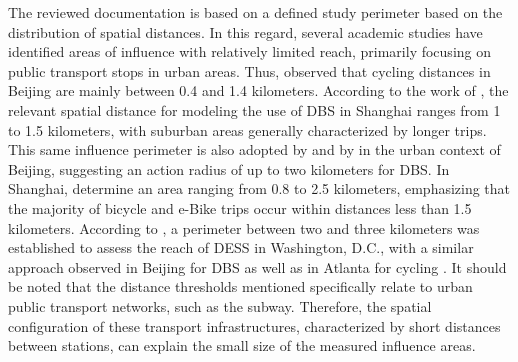 \begin{refsegment}
The reviewed documentation is based on a defined study perimeter based on the distribution of spatial distances. In this regard, several academic studies have identified areas of influence with relatively limited reach, primarily focusing on public transport stops in urban areas. Thus, \textcolor{blue}{\textcite[5]{wang_interchange_2016}} observed that cycling distances in Beijing are mainly between 0.4 and 1.4 kilometers. According to the work of \textcolor{blue}{\textcite[11]{hu_examining_2022}}, the relevant spatial distance for modeling the use of \acrshort{DBS} in Shanghai ranges from 1 to 1.5 kilometers, with suburban areas generally characterized by longer trips. This same influence perimeter is also adopted by \textcolor{blue}{\textcite[9]{jin_competition_2019}} and by \textcolor{blue}{\textcite[10]{fan_how_2019}} in the urban context of Beijing, suggesting an action radius of up to two kilometers for \acrshort{DBS}. In Shanghai, \textcolor{blue}{\textcite[185]{pan_intermodal_2010}} determine an area ranging from 0.8 to 2.5 kilometers, emphasizing that the majority of bicycle and \acrshort{e-Bike} trips occur within distances less than 1.5 kilometers. According to \textcolor{blue}{\textcite[5]{ma_connecting_2022}}, a perimeter between two and three kilometers was established to assess the reach of \acrshort{DESS} in Washington, D.C., with a similar approach observed in Beijing for \acrshort{DBS} \textcolor{blue}{\autocite[6]{ma_connecting_2022}} as well as in Atlanta for cycling \textcolor{blue}{\autocite[57]{bearn_adaption_2018}}. It should be noted that the distance thresholds mentioned specifically relate to urban public transport networks, such as the subway. Therefore, the spatial configuration of these transport infrastructures, characterized by short distances between stations, can explain the small size of the measured influence areas.%


\end{refsegment}
